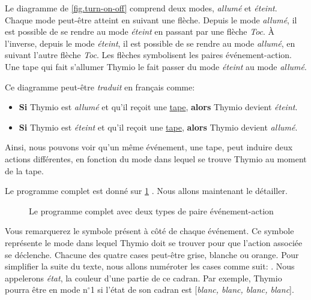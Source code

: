 Le diagramme de \cref{fig.turn-on-off} comprend deux modes, \textit{allumé} et \textit{éteint}. Chaque mode peut-être atteint en suivant une flèche. Depuis le mode \textit{allumé}, il est possible de se rendre au mode \textit{éteint} en passant par une flèche \textit{Toc}. À l'inverse, depuis le mode \textit{éteint}, il est possible de se rendre au mode \textit{allumé}, en suivant l'autre flèche \textit{Toc}. Les flèches symbolisent les paires événement-action. Une tape qui fait s'allumer Thymio le fait passer du mode \textit{éteint} au mode \textit{allumé}.

Ce diagramme peut-être \textit{traduit} en français comme:

\begin{itemize}
	\item \textbf{Si} Thymio est  \textit{allumé} et qu'il reçoit une \underline{tape}, \textbf{alors} Thymio devient \textit{éteint}.
	\item \textbf{Si} Thymio est  \textit{éteint} et qu'il reçoit une \underline{tape}, \textbf{alors} Thymio devient \textit{allumé}.
\end{itemize}

Ainsi, nous pouvons voir qu'un même événement, une tape, peut induire deux actions différentes, en fonction du mode dans lequel se trouve Thymio au moment de la tape.

Le programme complet est donné sur \cref{fig.state-changing} . Nous allons maintenant le détailler.

\begin{figure}[h]
    \centering
    \hspace{1cm}
    \caption{Le programme complet avec deux types de paire événement-action}
    \label{fig.state-changing}
\end{figure}

Vous remarquerez le symbole  présent à côté de chaque événement. Ce symbole représente le mode dans lequel Thymio doit se trouver pour que l'action associée se déclenche. Chacune des quatre cases peut-être grise, blanche ou orange. Pour simplifier la suite du texte, nous allons numéroter les cases comme suit: . Nous appelerons \textit{état}, la couleur d'une partie de ce cadran. Par exemple, Thymio pourra être en mode n$^\circ$1 si l'état de son cadran est [\textit{blanc, blanc, blanc, blanc}].


